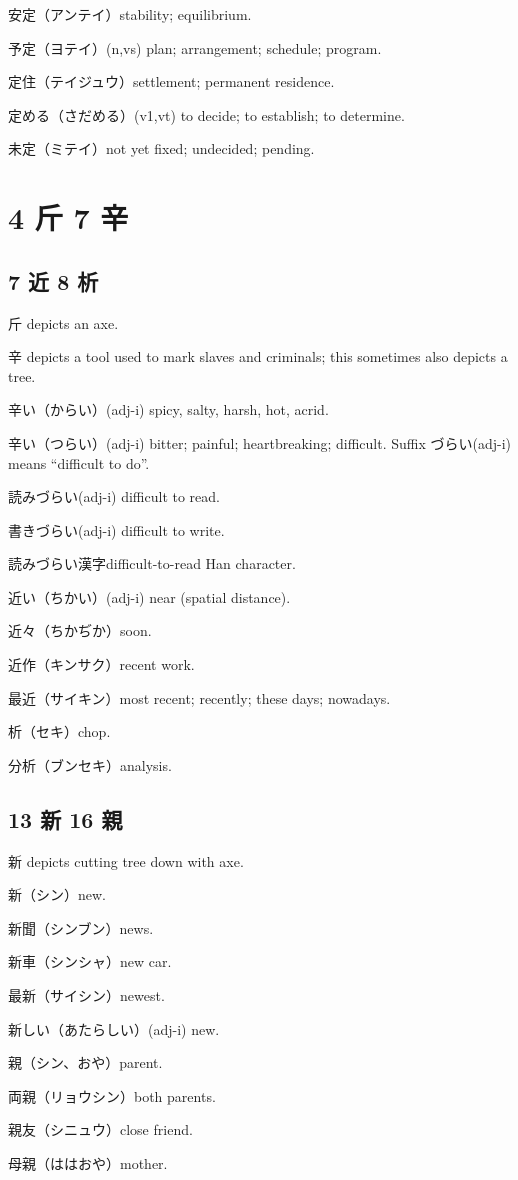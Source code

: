 安定（アンテイ）stability; equilibrium.

予定（ヨテイ）(n,vs) plan; arrangement; schedule; program.

定住（テイジュウ）settlement; permanent residence.

定める（さだめる）(v1,vt) to decide; to establish; to determine.

未定（ミテイ）not yet fixed; undecided; pending.

\section{4 斤 7 辛}

\subsection{7 近 8 析}

斤 depicts an axe.

辛 depicts a tool used to mark slaves and criminals;
this sometimes also depicts a tree.

辛い（からい）(adj-i) spicy, salty, harsh, hot, acrid.

辛い（つらい）(adj-i) bitter; painful; heartbreaking; difficult.
Suffix づらい(adj-i) means ``difficult to do''.

読みづらい(adj-i) difficult to read.

書きづらい(adj-i) difficult to write.

読みづらい漢字difficult-to-read Han character.

近い（ちかい）(adj-i) near (spatial distance).

近々（ちかぢか）soon.

近作（キンサク）recent work.

最近（サイキン）most recent; recently; these days; nowadays.

析（セキ）chop.

分析（ブンセキ）analysis.

\subsection{13 新 16 親}

新 depicts cutting tree down with axe.

新（シン）new.

新聞（シンブン）news.

新車（シンシャ）new car.

最新（サイシン）newest.

新しい（あたらしい）(adj-i) new.

親（シン、おや）parent.

両親（リョウシン）both parents.

親友（シニュウ）close friend.

母親（ははおや）mother.
